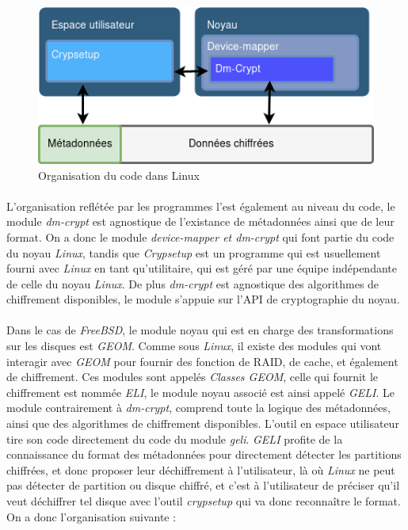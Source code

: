 \paragraph{}
\begin{figure}[h]
\centering
\includegraphics[width=.8\linewidth]{etat_art/organisation_linux.png}
\caption{\label{fig:OrgLinux}Organisation du code dans Linux}
\end{figure}

\paragraph{}
L'organisation reflétée par les programmes l'est également au niveau du code,
le module {\em dm-crypt} est agnostique de l'existance de métadonnées ainsi 
que de leur format. On a donc le module {\em device-mapper \em et \em dm-crypt}
qui font partie du code du noyau {\em Linux}, tandis que {\em Crypsetup} est un 
programme qui est usuellement fourni avec {\em Linux} en tant qu'utilitaire, 
qui est géré par une équipe indépendante de celle du noyau {\em Linux}. De plus 
{\em dm-crypt} est agnostique des algorithmes de chiffrement disponibles,
le module s'appuie sur l'API de cryptographie du noyau.

\paragraph{}
Dans le cas de {\em FreeBSD}, le module noyau qui est en charge des
transformations sur les disques est {\em GEOM}. Comme sous {\em Linux}, 
il existe des modules qui vont interagir avec {\em GEOM} pour fournir des 
fonction de RAID, de cache, et également de chiffrement. 
Ces modules sont appelés {\em Classes GEOM}, 
celle qui fournit le chiffrement est nommée {\em ELI}, le module noyau associé 
est ainsi appelé {\em GELI}. Le module contrairement à {\em dm-crypt}, 
comprend toute la logique des métadonnées, ainsi que des algorithmes de 
chiffrement disponibles. L'outil en espace utilisateur tire son code
directement du code du module {\em geli}. {\em GELI} profite de la 
connaissance du format des métadonnées pour directement détecter les 
partitions chiffrées, et donc proposer leur déchiffrement à l'utilisateur, 
là où {\em Linux} ne peut pas détecter de
partition ou disque chiffré, et c'est à l'utilisateur de préciser qu'il veut 
déchiffrer tel disque avec l'outil {\em crypsetup} qui va donc reconnaître le 
format. On a donc l'organisation suivante :


